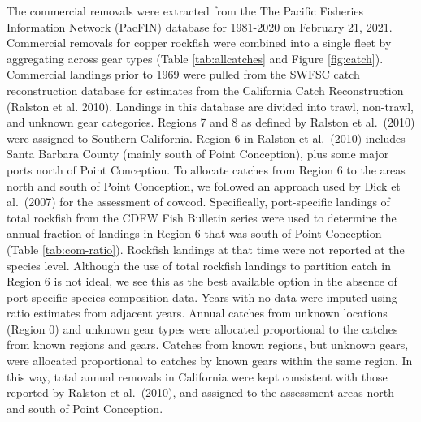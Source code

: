 \documentclass[11pt,
  english,
  a4paper,
]{article}
\begin{document}
The commercial removals were extracted from the The Pacific Fisheries Information Network (PacFIN) database for 1981-2020 on February 21, 2021. Commercial removals for copper rockfish were combined into a single fleet by aggregating across gear types (Table \ref{tab:allcatches} and Figure \ref{fig:catch}). Commercial landings prior to 1969 were pulled from the SWFSC catch reconstruction database for estimates from the California Catch Reconstruction {(Ralston et al. 2010)\leavevmode\tagmcend\tagstructend}. Landings in this database are divided into trawl, non-trawl, and unknown gear categories. Regions 7 and 8 as defined by Ralston et al.~{(2010)\leavevmode\tagmcend\tagstructend} were assigned to Southern California. Region 6 in Ralston et al.~{(2010)\leavevmode\tagmcend\tagstructend} includes Santa Barbara County (mainly south of Point Conception), plus some major ports north of Point Conception. To allocate catches from Region 6 to the areas north and south of Point Conception, we followed an approach used by Dick et al.~{(2007)\leavevmode\tagmcend\tagstructend} for the assessment of cowcod. Specifically, port-specific landings of total rockfish from the CDFW Fish Bulletin series were used to determine the annual fraction of landings in Region 6 that was south of Point Conception (Table \ref{tab:com-ratio}). Rockfish landings at that time were not reported at the species level. Although the use of total rockfish landings to partition catch in Region 6 is not ideal, we see this as the best available option in the absence of port-specific species composition data. Years with no data were imputed using ratio estimates from adjacent years. Annual catches from unknown locations (Region 0) and unknown gear types were allocated proportional to the catches from known regions and gears. Catches from known regions, but unknown gears, were allocated proportional to catches by known gears within the same region. In this way, total annual removals in California were kept consistent with those reported by Ralston et al.~{(2010)\leavevmode\tagmcend\tagstructend}, and assigned to the assessment areas north and south of Point Conception.

\leavevmode\tagmcend\tagstructend\par
\end{document}
